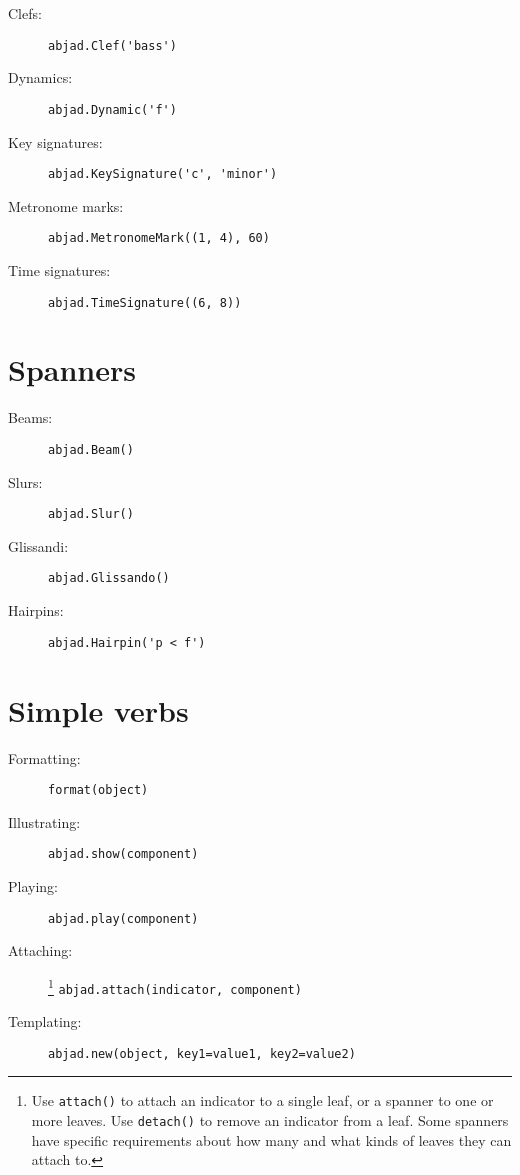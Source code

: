 \documentclass[a4paper]{tufte-handout}
\begin{document}
\begin{description}
    \item[Clefs:]
        \hfill \verb|abjad.Clef('bass')|
    \item[Dynamics:]
        \hfill \verb|abjad.Dynamic('f')|
    \item[Key signatures:]
        \hfill \verb|abjad.KeySignature('c', 'minor')|
    \item[Metronome marks:]
        \hfill \verb|abjad.MetronomeMark((1, 4), 60)|
    \item[Time signatures:]
        \hfill \verb|abjad.TimeSignature((6, 8))|
\end{description}

\section{Spanners}

\begin{description}
    \item[Beams:]
        \hfill \verb|abjad.Beam()|
    \item[Slurs:]
        \hfill \verb|abjad.Slur()|
    \item[Glissandi:]
        \hfill \verb|abjad.Glissando()|
    \item[Hairpins:]
        \hfill \verb|abjad.Hairpin('p < f')|
\end{description}

\section{Simple verbs}

\begin{description}
    \item[Formatting:]
        \hfill \verb|format(object)|
    \item[Illustrating:]
        \hfill \verb|abjad.show(component)|
    \item[Playing:]
        \hfill \verb|abjad.play(component)|
    \item[Attaching:]\footnote{%
        Use \texttt{attach()} to attach an indicator to a single leaf, or a
        spanner to one or more leaves. Use \texttt{detach()} to remove an
        indicator from a leaf. Some spanners have specific requirements about
        how many and what kinds of leaves they can attach to.}
        \hfill \verb|abjad.attach(indicator, component)|
    \item[Templating:]
        \hfill \verb|abjad.new(object, key1=value1, key2=value2)|
\end{description}
\end{document}
